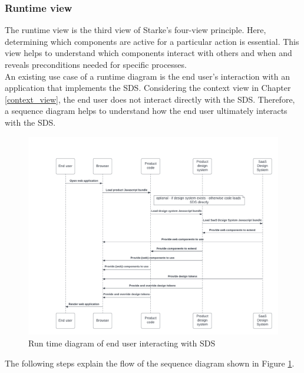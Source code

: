 \subsubsection{Runtime view}
The runtime view is the third view of Starke's four-view principle. Here, determining which components are active for a particular action is essential. This view helps to understand which components interact with others and when and reveals preconditions needed for specific processes. \citep{starke_effektive_2020}\\
An existing use case of a runtime diagram is the end user's interaction with an application that implements the \ac{SDS}. Considering the context view in Chapter \ref{context_view}, the end user does not interact directly with the \ac{SDS}. Therefore, a sequence diagram helps to understand how the end user ultimately interacts with the \ac{SDS}. \\
\begin{figure}[htb]
    \centerline{
    \includegraphics[width=\linewidth]{images/runtime_diagram_sds.png}}
\caption{Run time diagram of end user interacting with \ac{SDS}}
\label{runtime_diagram_sds}
\end{figure}
The following steps explain the flow of the sequence diagram shown in Figure \ref{runtime_diagram_sds}.
